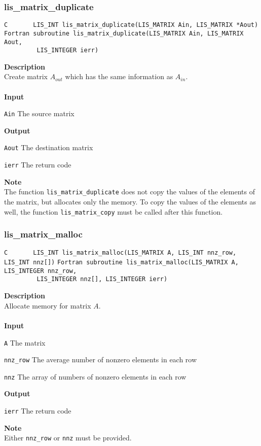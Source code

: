 \documentclass[a4paper]{article}
\newcommand{\namelistlabel}[1]{\mbox{#1}\hfill}
\newenvironment{namelist}[1]{%
\begin{list}{}
  {\let\makelabel\namelistlabel
  \settowidth{\labelwidth}{#1}
  \setlength{\leftmargin}{1.1\labelwidth}}
  }{%
\end{list}}
\begin{document}
\newpage
\subsubsection{lis\_matrix\_duplicate}
\begin{screen}
\verb|C       LIS_INT lis_matrix_duplicate(LIS_MATRIX Ain, LIS_MATRIX *Aout)|
\verb|Fortran subroutine lis_matrix_duplicate(LIS_MATRIX Ain, LIS_MATRIX Aout,|\\
\verb|         LIS_INTEGER ierr)|
\end{screen}
{\bf Description}\\
\indent
Create matrix $A_{out}$ which has the same information as $A_{in}$.
\\ \\
\noindent
{\bf Input}
\begin{namelist}{XXXXXXXXXXXXXXXXXXXX}
\item[\tt Ain] The source matrix
\end{namelist}
{\bf Output}
\begin{namelist}{XXXXXXXXXXXXXXXXXXXX}
\item[\tt Aout] The destination matrix
\item[\tt ierr] The return code
\end{namelist}
{\bf Note}\\
\indent
The function \verb|lis_matrix_duplicate| does not copy the values of 
the elements of the matrix, but allocates only the memory. 
To copy the values of the elements as well, the function
\verb|lis_matrix_copy| must be called after this function.

\subsubsection{lis\_matrix\_malloc}
\begin{screen}
\verb|C       LIS_INT lis_matrix_malloc(LIS_MATRIX A, LIS_INT nnz_row, LIS_INT nnz[])|
\verb|Fortran subroutine lis_matrix_malloc(LIS_MATRIX A, LIS_INTEGER nnz_row,|\\
\verb|         LIS_INTEGER nnz[], LIS_INTEGER ierr)|
\end{screen}
{\bf Description}\\
\indent
Allocate memory for matrix $A$.
\\ \\
\noindent
{\bf Input}
\begin{namelist}{XXXXXXXXXXXXXXXXXXXX}
\item[\tt A] The matrix
\item[\tt nnz\_row] The average number of nonzero elements in each row
\item[\tt nnz] The array of numbers of nonzero elements in each row
\end{namelist}
{\bf Output}
\begin{namelist}{XXXXXXXXXXXXXXXXXXXX}
\item[\tt ierr] The return code
\end{namelist}
{\bf Note}\\
\indent
Either \verb|nnz_row| or \verb|nnz| must be provided.
\end{document}
